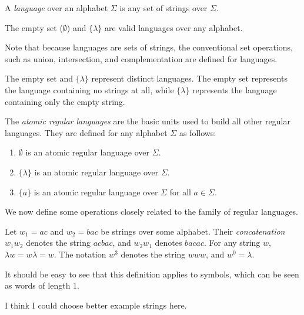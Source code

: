 \documentclass{bcthesis}
\renewcommand{\meo}{}
\begin{document}
		\begin{definition}[Language]
			A \textit{language} over an alphabet $\Sigma$ is any set of strings over $\Sigma$.

			The empty set ($\emptyset$) and $\{ \lambda \}$ are valid languages over any alphabet.

			Note that because languages are sets of strings, the conventional set operations, such as union, intersection, and complementation are defined for languages.
		\end{definition}

		\begin{remark}
			The empty set and $\{ \lambda \}$ represent distinct languages. 
			The empty set represents the language containing no strings at all, while $\{ \lambda \}$ represents the language containing only the empty string.
		\end{remark}


\label{ch:regular_expressions}
	
	\begin{definition}
		The \textit{atomic regular languages} are the basic units used to build all other regular languages.
		They are defined for any alphabet $\Sigma$ as follows:
		\begin{enumerate}[label=(\roman*), itemsep = -0.3 ex]
			\item $\emptyset$ is an atomic regular language over $\Sigma$.
			\item $\{ \lambda \}$ is an atomic regular language over $\Sigma$.
			\item $\{ a \}$ is an atomic regular language over $\Sigma$ for all $a \in \Sigma$.
		\end{enumerate}
	\end{definition}

	We now define some operations closely related to the family of regular languages.

	\begin{definition}[Concatenation]
		Let $w_1 = ac$ and $w_2 = bac$ be strings over some alphabet.
		Their \textit{concatenation} $w_1 w_2$ denotes the string $acbac$, and $w_2 w_1$ denotes $bacac$.
		For any string $w$, $\lambda w = w \lambda = w$.
		The notation $w^3$ denotes the string $www$, and $w^0 = \lambda$.

		It should be easy to see that this definition applies to symbols, which can be seen as words of length 1.

		\meo{I think I could choose better example strings here.}
	\end{definition}
\end{document}
